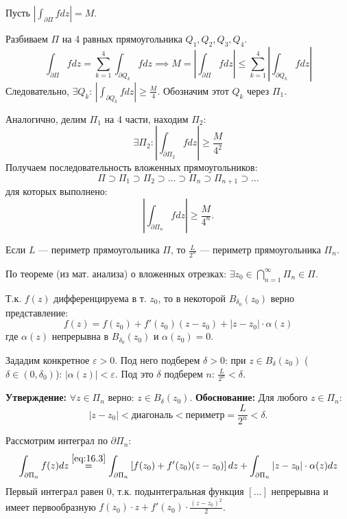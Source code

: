 \begin{tproof}
    Пусть $|\int_{\partial \Pi} f dz| = M$.
    
    Разбиваем $\Pi$ на 4 равных прямоугольника $Q_1, Q_2, Q_3, Q_4$.
    \[
        \int_{\partial \Pi} f dz = \sum_{k=1}^{4} \int_{\partial Q_k} f dz \implies M = \left| \int_{\partial \Pi} f dz \right| \le \sum_{k=1}^{4} \left| \int_{\partial Q_k} f dz \right|
    \]
    Следовательно, $\exists Q_k$: $|\int_{\partial Q_k} f dz| \ge \frac{M}{4}$. Обозначим этот $Q_k$ через $\Pi_1$.
    
    Аналогично, делим $\Pi_1$ на 4 части, находим $\Pi_2$:
    \[
        \exists \Pi_2 : \left| \int_{\partial \Pi_2} f dz \right| \ge \frac{M}{4^2}
    \]
    Получаем последовательность вложенных прямоугольников:
    \[
        \Pi \supset \Pi_1 \supset \Pi_2 \supset \dots \supset \Pi_n \supset \Pi_{n+1} \supset \dots
    \]
    для которых выполнено:
    \[
        \left| \int_{\partial \Pi_n} f dz \right| \ge \frac{M}{4^n}.
    \]
    
    Если $L$ — периметр прямоугольника $\Pi$, то $\frac{L}{2^n}$ — периметр прямоугольника $\Pi_n$.
    
    По теореме (из мат. анализа) о вложенных отрезках: $\exists z_0 \in \bigcap_{n=1}^{\infty} \Pi_n \in \Pi$.
    
    Т.к. $f(z)$ дифференцируема в т. $z_0$, то в некоторой $B_{\delta_0}(z_0)$ верно представление:
    \begin{equation} \label{eq:16.3}
        f(z) = f(z_0) + f'(z_0)(z - z_0) + |z - z_0| \cdot \alpha(z)
    \end{equation}
    где $\alpha(z)$ непрерывна в $B_{\delta_0}(z_0)$ и $\alpha(z_0) = 0$.

    Зададим конкретное $\varepsilon > 0$. Под него подберем $\delta > 0$: при $z \in B_{\delta}(z_0)$ ($ \delta \in (0, \delta_0)$): $|\alpha(z)| < \varepsilon$.
    Под это $\delta$ подберем $n$: $\frac{L}{2^n} < \delta$.
    
    \textbf{Утверждение:} $\forall z \in \Pi_n$ верно: $z \in B_{\delta}(z_0)$.
    \textbf{Обоснование:} Для любого $z \in \Pi_n$:
    \[
        |z - z_0| < \text{диагональ} < \text{периметр} = \frac{L}{2^n} < \delta.
    \]
    
    Рассмотрим интеграл по $\partial \Pi_n$:
    \[
        \int_{\partial \Pi_n} f(z) dz \overset{\eqref{eq:16.3}}{=} \int_{\partial \Pi_n} \left[ f(z_0) + f'(z_0)(z - z_0) \right] dz + \int_{\partial \Pi_n} |z - z_0| \cdot \alpha(z) dz
    \]
    Первый интеграл равен $0$, т.к. подынтегральная функция $[\dots]$ непрерывна и имеет первообразную $f(z_0) \cdot z + f'(z_0) \cdot \frac{(z - z_0)^2}{2}$.
    

\end{tproof}
